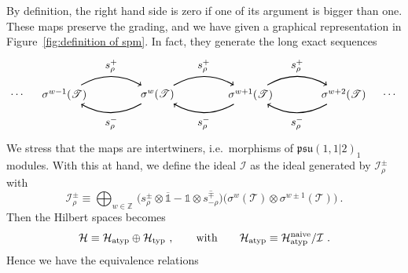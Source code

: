 \documentclass[12pt,a4paper]{article}
\newcommand{\be}{\begin{equation}}
\newcommand{\ee}{\end{equation}}
\begin{document}
By definition, the right hand side is zero if one of its argument is bigger than one.
These maps preserve the grading, 
and we have given a graphical representation in Figure~\ref{fig:definition of spm}. 
In fact, they generate the long exact sequences
\be 
\begin{tikzpicture}[baseline={([yshift=-.5ex]current bounding box.center)}]
\node (p1) at (-6,0) {$\sigma^{w-1}(\mathscr{T})$};
\node (p2) at (-3,0) {$\sigma^{w}(\mathscr{T})$};
\node (p3) at (0,0) {$\sigma^{w+1}(\mathscr{T})$};
\node (p4) at (3,0) {$\sigma^{w+2}(\mathscr{T})$};
\draw[thick,->,bend left=30] (p1) to node[above] {$s^+_{\rho}$} (p2);
\draw[thick,->,bend left=30] (p2) to node[above] {$s^+_{\rho}$} (p3);
\draw[thick,->,bend left=30] (p3) to node[above] {$s^+_{\rho}$} (p4);
\draw[thick,->,bend left=30] (p4) to node[below] {$s^-_{\rho}$} (p3);
\draw[thick,->,bend left=30] (p3) to node[below] {$s^-_{\rho}$} (p2);
\draw[thick,->,bend left=30] (p2) to node[below] {$s^-_{\rho}$} (p1);
\node at (-7.5,0) {$\cdots$};
\node at (4.5,0) {$\cdots$};
\end{tikzpicture}
\ee
We stress that the maps are intertwiners, i.e.\ morphisms of $\mathfrak{psu}(1,1|2)_1$ modules. With this at hand, we define the ideal $\mathcal{I}$ as the ideal generated by $\mathcal{I}^\pm_\rho$ with
\be 
\mathcal{I}^\pm_\rho \equiv \bigoplus_{w \in \mathds{Z}}\, \Big(s^\pm_{\rho} \otimes \overline{\mathds{1}} -\mathds{1} \otimes \overline{s^\mp_{-\rho}} \Big) \big(\sigma^w(\mathscr{T}) \otimes \sigma^{w\pm 1}(\mathscr{T})\big)\ .
\ee
Then the Hilbert spaces becomes 
\be 
\mathcal{H}\equiv \mathcal{H}_\text{atyp}\oplus \mathcal{H}_\text{typ} \ , \qquad \hbox{with} \qquad 
\mathcal{H}_\text{atyp} \equiv \mathcal{H}^\text{naive}_\text{atyp}/\mathcal{I}\ .
\ee
Hence we have the equivalence relations
\end{document}
